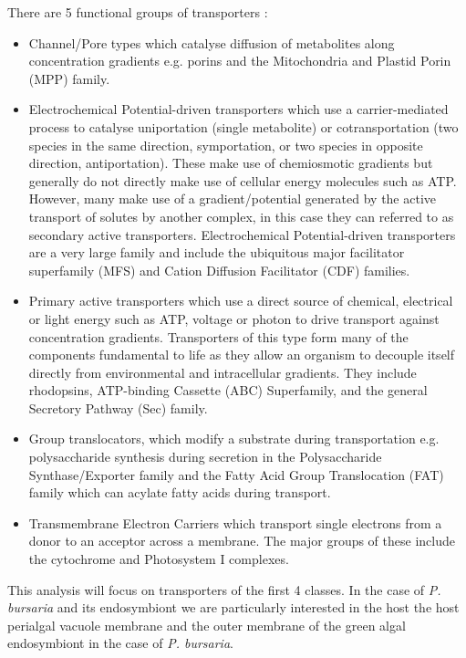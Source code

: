 There are 5 functional groups of transporters \citep{Saier2014}:
\begin{itemize}
    \item Channel/Pore types which catalyse diffusion of metabolites along concentration
        gradients e.g. porins and the Mitochondria and Plastid Porin (MPP) family.
    \item Electrochemical Potential-driven transporters which use a carrier-mediated process to catalyse
        uniportation (single metabolite) or cotransportation (two species in the same
        direction, symportation, or two species in opposite direction, antiportation).  These make use
        of chemiosmotic gradients but generally do not directly make use of cellular energy molecules
        such as ATP. However, many make use of a gradient/potential generated by the active transport
        of solutes by another complex, in this case they can referred to as secondary active transporters.
        Electrochemical Potential-driven transporters are a very large family and include 
        the ubiquitous major facilitator superfamily (MFS) and Cation Diffusion Facilitator (CDF) families. 
    \item Primary active transporters which use a direct source of chemical, electrical or light energy 
        such as ATP, voltage or photon to drive transport against concentration gradients.  Transporters
         of this type form many of the components fundamental to life as they allow an organism to 
         decouple itself directly from environmental and intracellular gradients. 
         They include rhodopsins, ATP-binding Cassette (ABC) Superfamily, and the general Secretory Pathway (Sec)
        family.
    \item Group translocators, which modify a substrate during transportation e.g. polysaccharide synthesis
        during secretion in the Polysaccharide Synthase/Exporter family and the Fatty Acid Group Translocation (FAT)
        family which can acylate fatty acids during transport.
    \item Transmembrane Electron Carriers which transport single electrons from a donor to an acceptor across
        a membrane. The major groups of these include the cytochrome and Photosystem I complexes. 
\end{itemize}

This analysis will focus on transporters of the first 4 classes.
In the case of \textit{P. bursaria} and its endosymbiont we are
particularly interested in the host 
the host perialgal vacuole membrane and the outer membrane of the green
algal endosymbiont in the case of \textit{P. bursaria}.  

